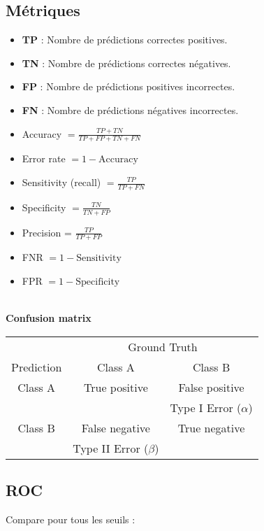 \documentclass[a4paper,portrait]{article}
\begin{document}
\begin{multicols}{2}
\subsection{Métriques}

\begin{itemize}
    \item \textbf{TP} : Nombre de prédictions correctes positives.
    \item \textbf{TN} : Nombre de prédictions correctes négatives.
    \item \textbf{FP} : Nombre de prédictions positives incorrectes.
    \item \textbf{FN} : Nombre de prédictions négatives incorrectes.
    \item Accuracy $= \frac{TP + TN}{TP + FP + TN + FN} $
    \item Error rate $= 1 - \text{Accuracy} $
    \item Sensitivity (recall) $= \frac{TP}{TP + FN} $
    \item Specificity $= \frac{TN}{TN + FP} $
    \item Precision = $\frac{TP}{TP + FP}$
    \item FNR $= 1 - \text{Sensitivity} $
    \item FPR $= 1 - \text{Specificity}$
\end{itemize}

\textbf{\\ Confusion matrix \\}

\begin{tabular}{|c|c|c|}
\hline
 & \multicolumn{2}{c|}{Ground Truth} \\
\cline{2-3}
Prediction & Class A & Class B \\
\hline
Class A & True positive & False positive \\
 & & Type I Error ($\alpha$) \\
\hline
Class B & False negative & True negative \\
 & Type II Error ($\beta$) & \\
\hline
\end{tabular}

\subsection{ROC}
Compare pour tous les seuils :


\end{multicols}
\end{document}
